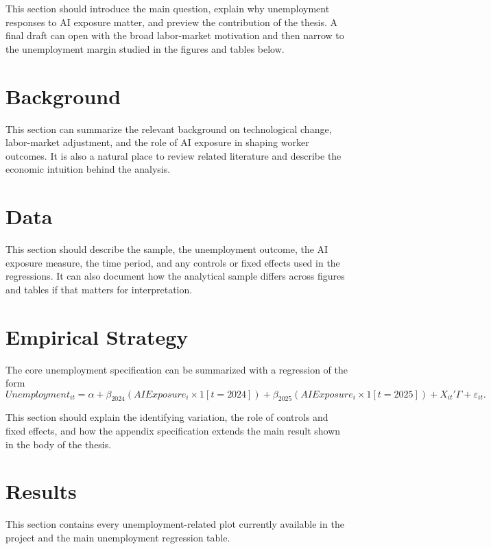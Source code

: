 \documentclass[12pt]{article}
\begin{document}
This section should introduce the main question, explain why unemployment responses to AI exposure matter, and preview the contribution of the thesis. A final draft can open with the broad labor-market motivation and then narrow to the unemployment margin studied in the figures and tables below.

\section{Background}

This section can summarize the relevant background on technological change, labor-market adjustment, and the role of AI exposure in shaping worker outcomes. It is also a natural place to review related literature and describe the economic intuition behind the analysis.

\section{Data}

This section should describe the sample, the unemployment outcome, the AI exposure measure, the time period, and any controls or fixed effects used in the regressions. It can also document how the analytical sample differs across figures and tables if that matters for interpretation.

\section{Empirical Strategy}

The core unemployment specification can be summarized with a regression of the form
\begin{equation}
Unemployment_{it} = \alpha + \beta_{2024}(AIExposure_i \times 1[t=2024]) + \beta_{2025}(AIExposure_i \times 1[t=2025]) + X_{it}'\Gamma + \varepsilon_{it}.
\end{equation}

This section should explain the identifying variation, the role of controls and fixed effects, and how the appendix specification extends the main result shown in the body of the thesis.

\section{Results}

This section contains every unemployment-related plot currently available in the project and the main unemployment regression table.
\end{document}
